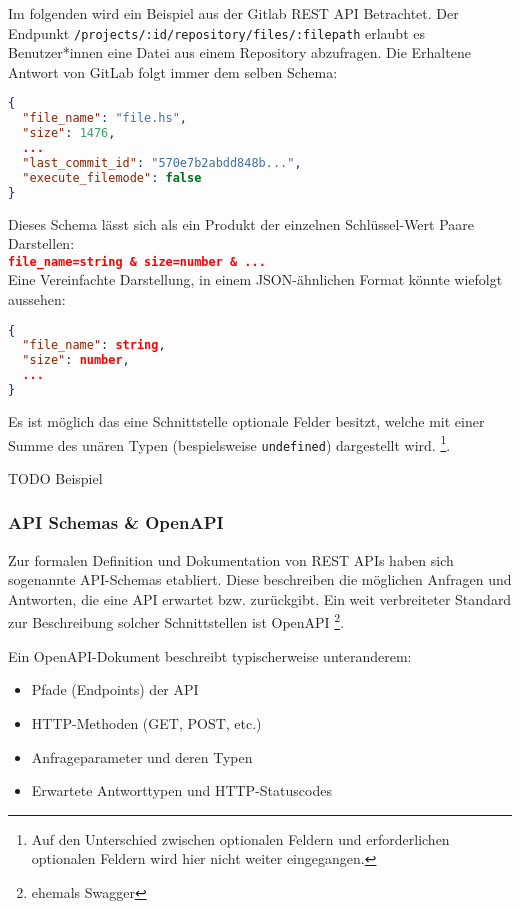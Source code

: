 Im folgenden wird ein Beispiel aus der Gitlab REST API Betrachtet. Der Endpunkt \texttt{/projects/:id/repository/files/:filepath} erlaubt es
Benutzer*innen eine Datei aus einem Repository abzufragen. Die Erhaltene Antwort von GitLab folgt immer dem selben Schema:
\begin{lstlisting}[language=json]
{
  "file_name": "file.hs",
  "size": 1476,
  ...
  "last_commit_id": "570e7b2abdd848b...",
  "execute_filemode": false
}
\end{lstlisting}

Dieses Schema lässt sich als ein Produkt der einzelnen Schlüssel-Wert Paare Darstellen: \\
\lstinline[language=json]|file_name=string & size=number & ...|\\
Eine Vereinfachte Darstellung, in einem JSON-ähnlichen Format könnte wiefolgt aussehen:

\begin{lstlisting}[language=json]
{
  "file_name": string,
  "size": number,
  ...
}
\end{lstlisting}

Es ist möglich das eine Schnittstelle optionale Felder besitzt, welche mit einer Summe 
des unären Typen (bespielsweise \texttt{undefined}) dargestellt wird.
\footnote{Auf den Unterschied zwischen optionalen Feldern und erforderlichen optionalen Feldern wird hier nicht weiter eingegangen.}.



TODO Beispiel

\subsubsection{API Schemas \& OpenAPI}

Zur formalen Definition und Dokumentation von REST APIs haben sich sogenannte API-Schemas etabliert.
Diese beschreiben die möglichen Anfragen und Antworten, die eine API erwartet bzw. zurückgibt.
Ein weit verbreiteter Standard zur Beschreibung solcher Schnittstellen ist OpenAPI \footnote{ehemals Swagger}.

Ein OpenAPI-Dokument beschreibt typischerweise unteranderem:
\begin{itemize}
    \item Pfade (Endpoints) der API
    \item HTTP-Methoden (GET, POST, etc.)
    \item Anfrageparameter und deren Typen
    \item Erwartete Antworttypen und HTTP-Statuscodes
\end{itemize}

